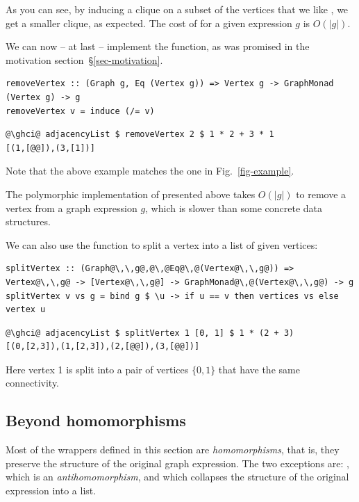 \noindent
As you can see, by inducing a clique on a subset of the vertices
that we like , we get a smaller clique, as expected.
The cost of  for a given expression $g$ is $O(|g|)$.

We can now -- at last -- implement the  function, as
was promised in the motivation section~\S\ref{sec-motivation}.

\begin{verbatim}
removeVertex :: (Graph g, Eq (Vertex g)) => Vertex g -> GraphMonad (Vertex g) -> g
removeVertex v = induce (/= v)
\end{verbatim}
\vspace{1mm}
\begin{verbatim}
@\ghci@ adjacencyList $ removeVertex 2 $ 1 * 2 + 3 * 1
[(1,[@@]),(3,[1])]
\end{verbatim}

\noindent
Note that the above example matches the one in Fig.~\ref{fig-example}.

The polymorphic implementation of  presented above takes
$O(|g|)$ to remove a vertex from a graph expression $g$, which is
slower than some concrete data structures.

We can also use the  function to split a vertex into a list of given vertices:

\begin{verbatim}
splitVertex :: (Graph@\,\,g@,@\,@Eq@\,@(Vertex@\,\,g@)) => Vertex@\,\,g@ -> [Vertex@\,\,g@] -> GraphMonad@\,@(Vertex@\,\,g@) -> g
splitVertex v vs g = bind g $ \u -> if u == v then vertices vs else vertex u
\end{verbatim}
\vspace{1mm}
\begin{verbatim}
@\ghci@ adjacencyList $ splitVertex 1 [0, 1] $ 1 * (2 + 3)
[(0,[2,3]),(1,[2,3]),(2,[@@]),(3,[@@])]
\end{verbatim}

\noindent
Here vertex 1 is split into a pair of vertices $\{0, 1\}$ that have the same connectivity.

\subsection{Beyond homomorphisms}\label{sub-beyond}

Most of the  wrappers defined in this section are \emph{homomorphisms},
that is, they preserve the structure of the original graph expression. The two
exceptions are: , which is an \emph{antihomomorphism}, and
 which collapses the structure of the original expression into a list.


